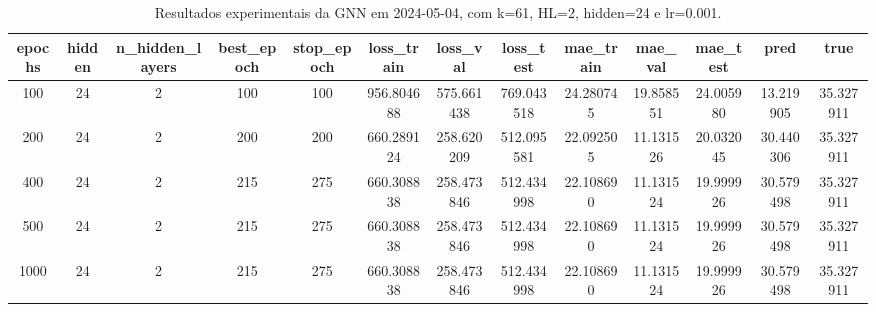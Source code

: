 \begin{table}[h]
\centering
\caption{Resultados experimentais da GNN em 2024-05-04, com k=61, HL=2, hidden=24 e lr=0.001.}
\label{tab:gnn_results_k61_hl2_h24_d20240504}
\begin{tabular}{ccccccccccccc}
\toprule
epochs & hidden & n\_hidden\_layers & best\_epoch & stop\_epoch & loss\_train & loss\_val & loss\_test & mae\_train & mae\_val & mae\_test & pred & true \\
\midrule
100 & 24 & 2 & 100 & 100 & 956.804688 & 575.661438 & 769.043518 & 24.280745 & 19.858551 & 24.005980 & 13.219905 & 35.327911 \\
200 & 24 & 2 & 200 & 200 & 660.289124 & 258.620209 & 512.095581 & 22.092505 & 11.131526 & 20.032045 & 30.440306 & 35.327911 \\
400 & 24 & 2 & 215 & 275 & 660.308838 & 258.473846 & 512.434998 & 22.108690 & 11.131524 & 19.999926 & 30.579498 & 35.327911 \\
500 & 24 & 2 & 215 & 275 & 660.308838 & 258.473846 & 512.434998 & 22.108690 & 11.131524 & 19.999926 & 30.579498 & 35.327911 \\
1000 & 24 & 2 & 215 & 275 & 660.308838 & 258.473846 & 512.434998 & 22.108690 & 11.131524 & 19.999926 & 30.579498 & 35.327911 \\
\bottomrule
\end{tabular}
\end{table}
